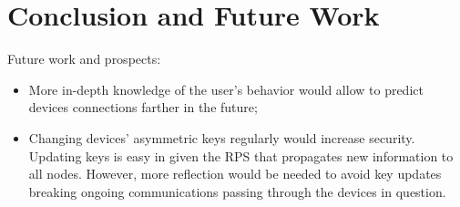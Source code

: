 \section{Conclusion and Future Work}

 Future work and prospects:
\begin{itemize}
	\item More in-depth knowledge of the user's behavior would allow to predict devices connections farther in the future;
	\item Changing devices' asymmetric keys regularly would increase security.
	Updating keys is easy in \name given the RPS that propagates new information to all nodes.
	However, more reflection would be needed to avoid key updates breaking ongoing communications passing through the devices in question.

\end{itemize}